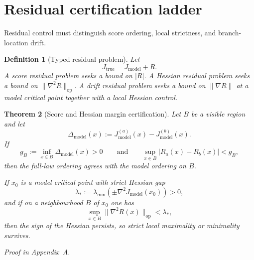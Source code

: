 \documentclass[11pt,a4paper]{article}
\numberwithin{equation}{section}
\theoremstyle{thmcompact}
\newtheorem{theorem}{Theorem}[section]
\newtheorem{definition}[theorem]{Definition}
\theoremstyle{remark}
\newcommand{\proofappendix}{\par{\hfill\scriptsize\emph{Proof in Appendix~A.}}\par}
\begin{document}
\section{Residual certification ladder}

Residual control must distinguish score ordering, local strictness, and branch-location drift.

\begin{definition}[Typed residual problem]
Let
\begin{equation}
J_{\mathrm{true}}=J_{\mathrm{model}}+R.
\end{equation}
A \emph{score residual problem} seeks a bound on $|R|$. A \emph{Hessian residual problem} seeks a bound on $\|\nabla^2R\|_{\mathrm{op}}$. A \emph{drift residual problem} seeks a bound on $\|\nabla R\|$ at a model critical point together with a local Hessian control.
\end{definition}

\begin{theorem}[Score and Hessian margin certification]
\label{thm:margin-certification}
Let $B$ be a visible region and let
\begin{equation}
\Delta_{\mathrm{model}}(x):=J_{\mathrm{model}}^{(a)}(x)-J_{\mathrm{model}}^{(b)}(x).
\end{equation}
If
\begin{equation}
g_B:=\inf_{x\in B}\Delta_{\mathrm{model}}(x)>0
\qquad \text{and} \qquad
\sup_{x\in B}|R_a(x)-R_b(x)|<g_B,
\end{equation}
then the full-law ordering agrees with the model ordering on $B$.

If $x_0$ is a model critical point with strict Hessian gap
\begin{equation}
\lambda_*:=\lambda_{\min}(\pm \nabla^2J_{\mathrm{model}}(x_0))>0,
\end{equation}
and if on a neighbourhood $B$ of $x_0$ one has
\begin{equation}
\sup_{x\in B}\|\nabla^2R(x)\|_{\mathrm{op}}<\lambda_*,
\end{equation}
then the sign of the Hessian persists, so strict local maximality or minimality survives.
\end{theorem}

\proofappendix
\end{document}
